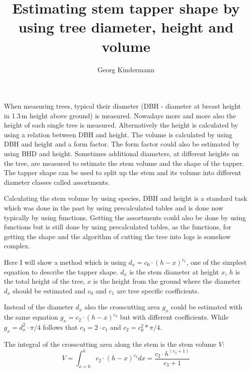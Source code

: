 \documentclass[twocolumn,10pt]{article}
\title{Estimating stem tapper shape by using tree diameter, height and volume}
\author{Georg Kindermann}
\begin{document}
\maketitle




When measuring trees, typical their diameter (DBH - diameter at breast height in
1.3\,m height above ground) is measured. Nowadays more and more also the height
of each single tree is measured. Alternatively the height is calculated by using
a relation between DBH and height. The volume is calculated by using DBH and
height and a form factor. The form factor could also be estimated by using BHD
and height. Sometimes additional diameters, at different heights on the tree,
are measured to estimate the stem volume and the shape of the tapper. The tapper
shape can be used to split up the stem and its volume into different diameter
classes called assortments.

Calculating the stem volume by using species, DBH and height is a standard task
which was done in the past by using precalculated tables and is done now
typically by using functions. Getting the assortments could also be done by
using functions but is still done by using precalculated tables, as the
functions, for getting the shape and the algorithm of cutting the tree into logs
is somehow complex.

Here I will show a method which is using $d_x = c_0 \cdot (h - x)^{c_1}$, one of
the simplest equation to describe the tapper shape. $d_x$ is the stem diameter
at height $x$, $h$ is the total height of the tree, $x$ is the height
from the ground where the diameter $d_x$ should be estimated and $c_0$ and
$c_1$ are tree specific coefficients.

Instead of the diameter $d_x$ also the crosscutting area $g_x$ could be
estimated with the same equation $g_x = c_2 \cdot (h - x)^{c_3}$ but with
different coefficients. While $g_x = d^2_x \cdot \pi / 4$ follows that $c_3 = 2
\cdot c_1$ and $c_2 = c^2_0 * \pi / 4$.

The integral of the crosscutting area along the stem is the stem volume $V$:
$$V =
\int_{x=0}^h c_2 \cdot (h - x)^{c_3} dx = \frac{c_2
\cdot h^{(c_3 + 1)}}{c_3 + 1}$$
\end{document}
